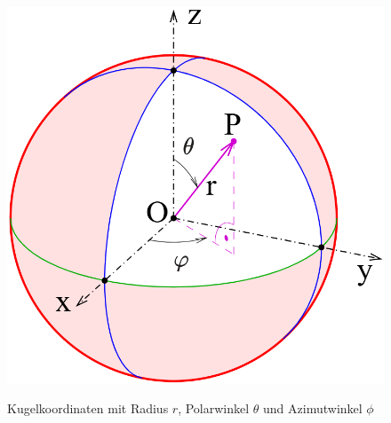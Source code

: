 \begin{figure}
	\centering
	\includegraphics[width=0.7\linewidth]{papers/geodaeten/Abbildungen/Linienelemente/LinKugel1}
	\caption{Kugelkoordinaten mit Radius $r$, Polarwinkel $\theta$ und Azimutwinkel $\phi$}
	\label{geodaeten:figure:Linienelemente:Kugelkoordinaten:Kugelkoordinaten}
	\cite{geodaeten:Kugelkoordinaten}
\end{figure}

